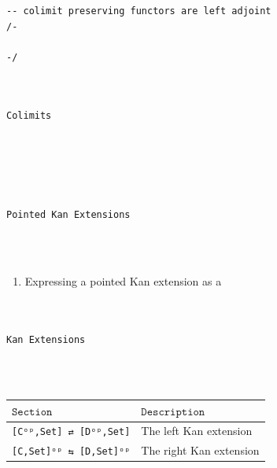 \documentclass{book}
\theoremstyle{definition}
\newcounter{lcounter}
\renewcommand{\chapter}[1]{
\newpage
{
\Huge 
\begin{center}
\ \\
\ \\
\thispagestyle{empty}
\texttt{#1}
\end{center}}
\ \\
\ \\
}
\begin{document}
{{\begin{center}
\begin{tcolorbox}[width=5in,colback={white},title={\begin{center}\texttt{Lean \thelcounter} \addtocounter{lcounter}{1}  \end{center}},colbacktitle=Blue,coltitle=black]
\begin{verbatim}
-- colimit preserving functors are left adjoint
/-

-/

\end{verbatim}
\end{tcolorbox}
\end{center}

\chapter{Colimits}

\chapter{Pointed Kan Extensions}

\begin{enumerate}
\item Expressing a pointed Kan extension as a 
\end{enumerate}

\chapter{Kan Extensions}

{\footnotesize
\begin{center}
\begin{tabular}{|| l || l ||} 
 \hline
 $\texttt{Section}$ & $\texttt{Description}$ \\
 \hline
\hline
\texttt{[Cᵒᵖ,Set] ⇄ [Dᵒᵖ,Set]} & The left Kan extension \\
\hline
\texttt{[C,Set]ᵒᵖ ⇆ [D,Set]ᵒᵖ} & The right Kan extension \\
\hline
\end{tabular}
\end{center}}
\ \\
\ \\



}}
\end{document}
